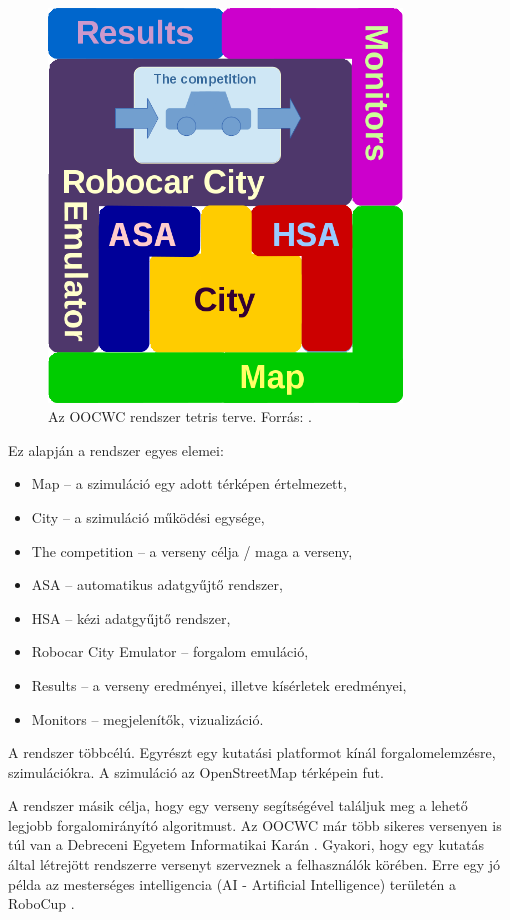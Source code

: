 \documentclass[a4paper,12pt]{report}
\begin{document}
\begin{figure}[h]
\centerline{
\includegraphics[width=3.7in]{img/tetris_plan}}
\caption{Az OOCWC rendszer tetris terve. Forrás: \cite{oocwcrepo}.}
\label{basedesign}
\end{figure}

Ez alapján a rendszer egyes elemei:

\begin{itemize}
\item Map -- a szimuláció egy adott térképen értelmezett,
\item City -- a szimuláció működési egysége,
\item The competition -- a verseny célja / maga a verseny,
\item ASA -- automatikus adatgyűjtő rendszer,
\item HSA -- kézi adatgyűjtő rendszer,
\item Robocar City Emulator -- forgalom emuláció,
\item Results -- a verseny eredményei, illetve kísérletek eredményei,
\item Monitors -- megjelenítők, vizualizáció.
\end{itemize}

A rendszer többcélú. Egyrészt egy kutatási platformot kínál forgalomelemzésre, szimulációkra. A szimuláció az OpenStreetMap \cite{osm} térképein fut. 

\vspace{2mm}
A rendszer másik célja, hogy egy verseny segítségével találjuk meg a lehető legjobb forgalomirányító algoritmust. Az OOCWC már több sikeres versenyen is túl van a Debreceni Egyetem Informatikai Karán \cite{competitions}. Gyakori, hogy egy kutatás által létrejött rendszerre versenyt szerveznek a felhasználók körében. Erre egy jó példa az mesterséges intelligencia (AI - Artificial Intelligence) területén a RoboCup \cite{robocup}.
\end{document}
